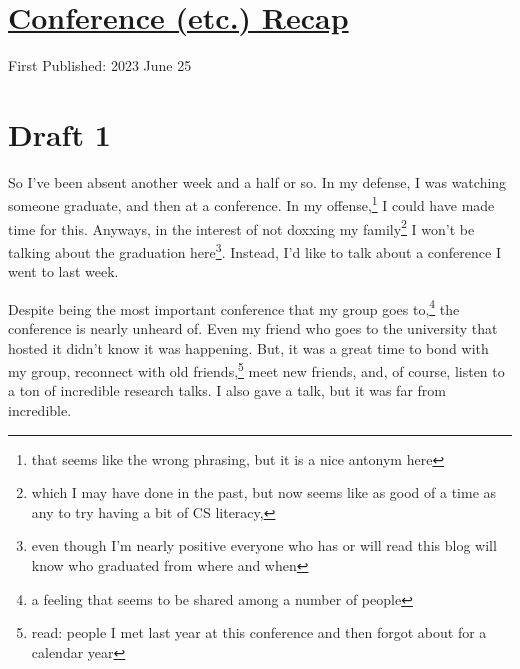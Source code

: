 \documentclass[12pt]{article}[titlepage]
\newcommand{\1}{\={a}}
\newcommand{\2}{\={e}}
\newcommand{\3}{\={\i}}
\newcommand{\4}{\=o}
\newcommand{\5}{\=u}
\newcommand{\6}{\={A}}
\renewcommand{\,}{\textsuperscript{,}}
\begin{document}
\doublespacing
\section{\href{conference.html}{Conference (etc.) Recap}}
First Published: 2023 June 25
\section{Draft 1}
So I've been absent another week and a half or so.
In my defense, I was watching someone graduate, and then at a conference.
In my offense,\footnote{that seems like the wrong phrasing, but it is a nice antonym here} I could have made time for this.
Anyways, in the interest of not doxxing my family\footnote{which I may have done in the past, but now seems like as good of a time as any to try having a bit of CS literacy,} I won't be talking about the graduation here\footnote{even though I'm nearly positive everyone who has or will read this blog will know who graduated from where and when}.
Instead, I'd like to talk about a conference I went to last week.

Despite being the most important conference that my group goes to,\footnote{a feeling that seems to be shared among a number of people} the conference is nearly unheard of.
Even my friend who goes to the university that hosted it didn't know it was happening.
But, it was a great time to bond with my group, reconnect with old friends,\footnote{read: people I met last year at this conference and then forgot about for a calendar year} meet new friends, and, of course, listen to a ton of incredible research talks.
I also gave a talk, but it was far from incredible. 
\end{document}
